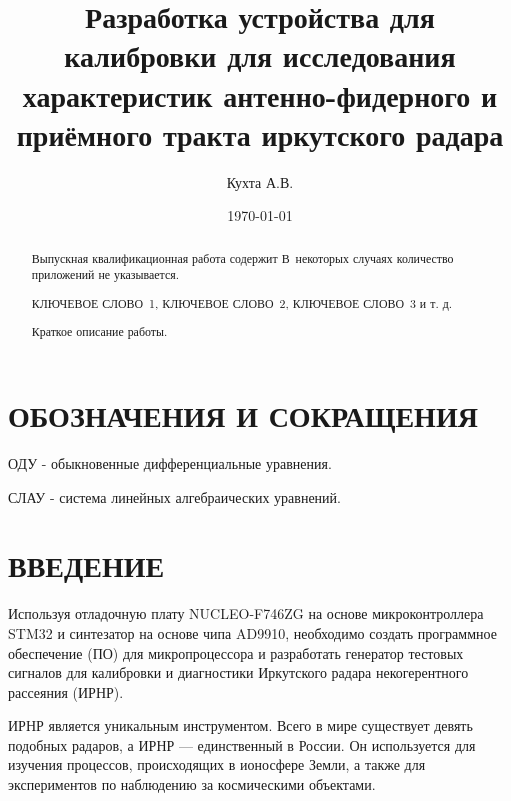 \documentclass[rusmathsym, eqnumwithinsec, amspack, hyperref]{bomgost}
\author{Кухта А.В.}
\title{Разработка устройства для калибровки для исследования характеристик антенно-фидерного и приёмного тракта иркутского радара}
\date{\today}
\begin{document}
\maketitle
\thispagestyle{empty}
\newpage

\begin{abstract}
Выпускная квалификационная работа содержит \printtotpage \printtotfig \printtottab \printtotref[.] В~некоторых случаях количество приложений не указывается. 


КЛЮЧЕВОЕ СЛОВО~1, КЛЮЧЕВОЕ СЛОВО~2, КЛЮЧЕВОЕ СЛОВО~3 и т. д.

Краткое описание работы.
\end{abstract}


\tableofcontents


\section*{ОБОЗНАЧЕНИЯ И СОКРАЩЕНИЯ}
ОДУ - обыкновенные дифференциальные уравнения.

СЛАУ - система линейных алгебраических уравнений.

%
%

\section*{ВВЕДЕНИЕ}
Используя отладочную плату NUCLEO-F746ZG на основе микроконтроллера STM32 и синтезатор на основе чипа AD9910, необходимо создать программное обеспечение (ПО) для микропроцессора и разработать генератор тестовых сигналов для калибровки и диагностики Иркутского радара некогерентного рассеяния (ИРНР).

ИРНР является уникальным инструментом. Всего в мире существует девять подобных радаров, а ИРНР — единственный в России. Он используется для изучения процессов, происходящих в ионосфере Земли, а также для экспериментов по наблюдению за космическими объектами.
\end{document}
